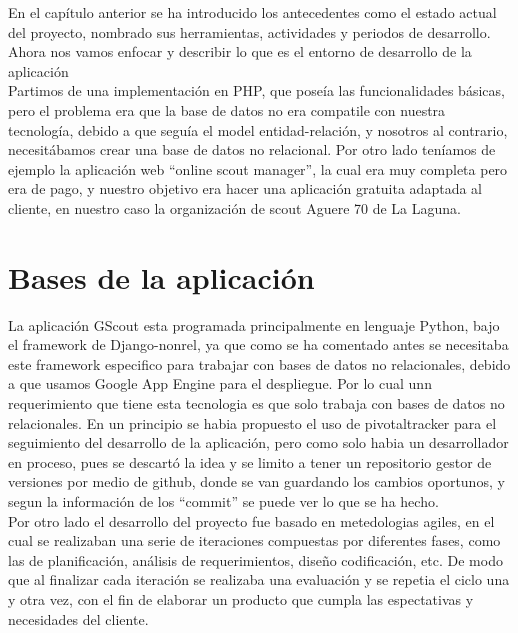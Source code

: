 

En el capítulo anterior se ha introducido los antecedentes como el estado actual del proyecto, 
nombrado sus herramientas, actividades y periodos de desarrollo. Ahora nos vamos enfocar y describir lo que es el
entorno de desarrollo de la aplicación\\

Partimos de una implementación en PHP, que poseía las funcionalidades básicas, pero el problema era que la base de datos
no era compatile con nuestra tecnología, debido a que seguía el model entidad-relación, y nosotros al contrario, necesitábamos
crear una base de datos no relacional. Por otro lado teníamos de ejemplo la aplicación web ``online scout manager'', la cual era muy completa
pero era de pago, y nuestro objetivo era hacer una aplicación gratuita adaptada al cliente, en nuestro caso la organización de scout Aguere 70 de La Laguna.



\section{Bases de la aplicación}
\label{2:sec1}

La aplicación GScout esta programada principalmente en lenguaje Python, bajo el framework de Django-nonrel,  
ya que como se ha comentado antes se necesitaba este framework especifico para trabajar con bases de datos no relacionales,
debido a que usamos Google App Engine para el despliegue. Por lo cual unn requerimiento que tiene esta tecnologia es que solo trabaja con
bases de datos no relacionales. En un principio se habia propuesto el uso de pivotaltracker para el seguimiento del desarrollo de la aplicación, 
pero como solo habia un desarrollador en proceso, pues se descartó la idea y se limito a tener un repositorio gestor de versiones por medio de
github, donde se van guardando los cambios oportunos, y segun la información de los ``commit'' se puede ver lo que se ha hecho.\\

Por otro lado el desarrollo del proyecto fue basado en metedologias agiles, en el cual se realizaban una serie de iteraciones compuestas por diferentes fases, como 
las de planificación, análisis de requerimientos, diseño codificación, etc. De modo que al finalizar cada iteración se realizaba una evaluación y se repetia el ciclo una y otra vez,
con el fin de elaborar un producto que cumpla las espectativas y necesidades del cliente.\\

